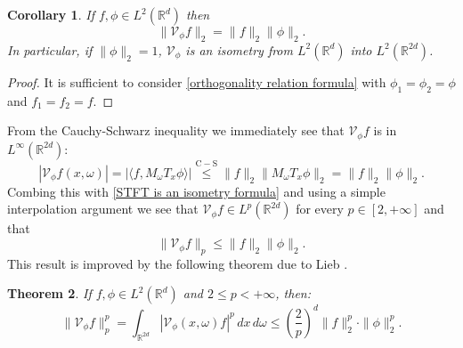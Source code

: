 \documentclass[corpo=11pt, stile=classica, tipotesi=custom,
greek, evenboxes, english, twoside, cucitura]{toptesi} %
\numberwithin{equation}{chapter}
\newtheorem{teo}{Theorem}[chapter] %
\newtheorem{cor}[teo]{Corollary}
\theoremstyle{definition}
\theoremstyle{remark}
\newcommand{\R}{\mathbb{R}} %
\newcommand{\V}{\mathcal{V}} %
\begin{document}
\begin{cor}
	If $f, \phi \in L^2(\R^d)$ then
	\begin{equation}\label{STFT is an isometry formula}
		\| \V_{\phi} f\|_2 = \| f \|_2 \| \phi \|_2.
	\end{equation} 
	In particular, if $\| \phi \|_2 = 1$, $\V_{\phi}$ is an isometry from $L^2(\R^d)$ into $L^2(\R^{2d})$.
\end{cor}
\begin{proof}
	It is sufficient to consider \eqref{orthogonality relation formula} with $\phi_1 = \phi_2 = \phi$ and $f_1 = f_2 = f$.
\end{proof}
From the Cauchy-Schwarz inequality we immediately see that $\V_{\phi} f$ is in $L^{\infty}(\R^{2d})$:
\begin{equation}\label{STFT is bounded}
	|\V_{\phi} f(x,\omega)| = |\langle f, M_{\omega} T_x \phi\rangle| \overset{\mathrm{C-S}}{\leq} \|f\|_2 \|M_{\omega}T_x \phi\|_2 = \|f\|_2 \|\phi\|_2.
\end{equation}
Combing this with \eqref{STFT is an isometry formula} and using a simple interpolation argument we see that $\V_{\phi}f \in L^p(\R^{2d})$ for every $p \in [2,+\infty]$ and that 
\begin{equation}\label{STFT is in L^p for p>=2}
	\|\V_{\phi}f\|_p \leq \|f\|_2 \|\phi\|_2.
\end{equation}
This result is improved by the following theorem due to Lieb \cite{lieb_integral}.
\begin{teo}\label{Lieb's inequality}
	If $f,\phi \in L^2(\R^d)$ and $2 \leq p < +\infty$, then:
	\begin{equation}\label{Lieb's inequality formula}
		\| \V_{\phi} f \|_p^p = \int_{\R^{2d}} |\V_{\phi}(x,\omega)f|^p \,dx\,d\omega \leq \left(\dfrac{2}{p}\right)^d \|f\|_2^p \cdot \|\phi\|_2^p.
	\end{equation}
\end{teo}
\end{document}
